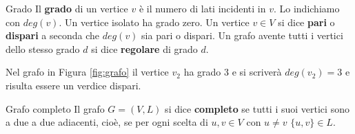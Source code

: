 \begin{defbox}{Grado}
    Il \textbf{grado} di un vertice $v$ è il numero di lati incidenti in $v$. Lo indichiamo con $deg(v)$. Un vertice isolato ha grado zero. Un vertice $v \in V$ si dice \textbf{pari} o \textbf{dispari} a seconda che $deg(v)$ sia pari o dispari. Un grafo avente tutti i vertici dello stesso grado $d$ si dice \textbf{regolare} di grado $d$.
\end{defbox}
\begin{example}
	Nel grafo in Figura \ref{fig:grafo} il vertice $v_{2}$ ha grado 3 e si scriverà $deg(v_{2})=3$ e risulta essere un verdice dispari.
\end{example}
\begin{defbox}{Grafo completo}
    Il grafo $G=(V,L)$ si dice \textbf{completo} se tutti i suoi vertici sono a due a due adiacenti, cioè, se per ogni scelta di $u,v \in V$ con $u \neq v$ $\{u,v\} \in L$.
\end{defbox}

